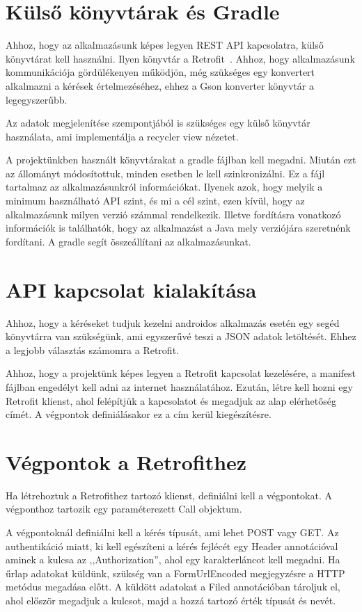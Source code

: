 \documentclass[
]{thesis-ekf}
\theoremstyle{definition}
\theoremstyle{remark}
\begin{document}
	\section{Külső könyvtárak és Gradle}
	Ahhoz, hogy az alkalmazásunk képes legyen REST API kapcsolatra, külső könyvtárat kell használni. Ilyen könyvtár a Retrofit~\cite{retrofit_doc}. Ahhoz, hogy alkalmazásunk kommunikációja gördülékenyen működjön, még szükséges egy konvertert alkalmazni a kérések értelmezéséhez, ehhez a Gson konverter könyvtár a legegyszerűbb. 
	
	Az adatok megjelenítése szempontjából is szükséges egy külső könyvtár használata, ami implementálja a recycler view nézetet.
	
	A projektünkben használt könyvtárakat a gradle fájlban kell megadni. Miután ezt az állományt módosítottuk, minden esetben le kell szinkronizálni. Ez a fájl tartalmaz az alkalmazásunkról információkat. Ilyenek azok, hogy melyik a minimum használható API szint, és mi a cél szint, ezen kívül, hogy az alkalmazásunk milyen verzió számmal rendelkezik. Illetve fordításra vonatkozó információk is találhatók, hogy az alkalmazást a Java mely verziójára szeretnénk fordítani. A gradle segít összeállítani az alkalmazásunkat.
	
	\section{API kapcsolat kialakítása}
	Ahhoz, hogy a kéréseket tudjuk kezelni androidos alkalmazás esetén egy segéd könyvtárra van szükségünk, ami egyszerűvé teszi a JSON adatok letöltését. Ehhez a legjobb választás számomra a Retrofit.
	
	Ahhoz, hogy a projektünk képes legyen a Retrofit kapcsolat kezelésére, a manifest fájlban engedélyt kell adni az internet használatához. Ezután, létre kell hozni egy Retrofit klienst, ahol felépítjük a kapcsolatot és megadjuk az alap elérhetőség címét. A végpontok definiálásakor ez a cím kerül kiegészítésre. 
	
	\section{Végpontok a Retrofithez}
	Ha létrehoztuk a Retrofithez tartozó klienst, definiálni kell a végpontokat. A végponthoz tartozik egy paraméterezett Call objektum.
	
	A végpontoknál definiálni kell a kérés típusát, ami lehet POST vagy GET. Az authentikáció miatt, ki kell egészíteni a kérés fejlécét egy Header annotációval aminek a kulcsa az ,,Authorization'', ahol egy karakterláncot kell megadni. Ha űrlap adatokat küldünk, szükség van a FormUrlEncoded megjegyzésre a HTTP metódus megadása előtt. A küldött adatokat a Filed annotációban tároljuk el, ahol először megadjuk a kulcsot, majd a hozzá tartozó érték típusát és nevét.
	
\end{document}
